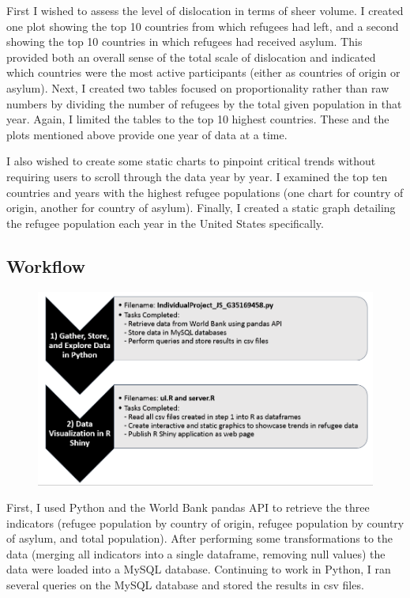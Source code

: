 \documentclass{article}
\begin{document}
First I wished to assess the level of dislocation in terms of sheer volume. I created one plot showing the top 10 countries from which refugees had left, and a second showing the top 10 countries in which refugees had received asylum. This provided both an overall sense of the total scale of dislocation and indicated which countries were the most active participants (either as countries of origin or asylum).
Next, I created two tables focused on proportionality rather than raw numbers by dividing the number of refugees by the total given population in that year. Again, I limited the tables to the top 10 highest countries. These and the plots mentioned above provide one year of data at a time. \vspace{2mm}

\noindent
I also wished to create some static charts to pinpoint critical trends without requiring users to scroll through the data year by year. I examined the top ten countries and years with the highest refugee populations (one chart for country of origin, another for country of asylum). Finally, I created a static graph detailing the refugee population each year in the United States specifically.

\subsection{Workflow}

\begin{figure}[hb]
  \centering
    \includegraphics[scale=0.5]{Indiv_Project_Workflow}

\end{figure}


\noindent First, I used Python and the World Bank pandas API to retrieve the three indicators (refugee population by country of origin, refugee population by country of asylum, and total population). After performing some transformations to the data (merging all indicators into a single dataframe, removing null values) the data were loaded into a MySQL database. Continuing to work in Python, I ran several queries on the MySQL database and stored the results in csv files. \vspace{2mm}
\end{document}
